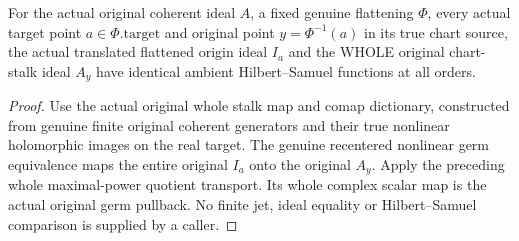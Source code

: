 \begin{theorem}
\label{hir:smooth-centre-fixed-real-original-ambient-hs-dictionary-whole-parent}
\leanok
For the actual original coherent ideal $A$, a fixed genuine flattening
$\Phi$, every actual target point $a\in\Phi.\mathrm{target}$ and original
point $y=\Phi^{-1}(a)$ in its true chart source, the actual translated
flattened origin ideal $I_a$ and the WHOLE original chart-stalk ideal
$A_y$ have identical ambient Hilbert--Samuel functions at all orders.
\end{theorem}
\begin{proof}
Use the actual original whole stalk map and comap dictionary, constructed
from genuine finite original coherent generators and their true nonlinear
holomorphic images on the real target. The genuine recentered nonlinear
germ equivalence maps the entire original $I_a$ onto the original $A_y$.
Apply the preceding whole maximal-power quotient transport. Its whole
complex scalar map is the actual original germ pullback. No finite jet,
ideal equality or Hilbert--Samuel comparison is supplied by a caller.
\end{proof}

